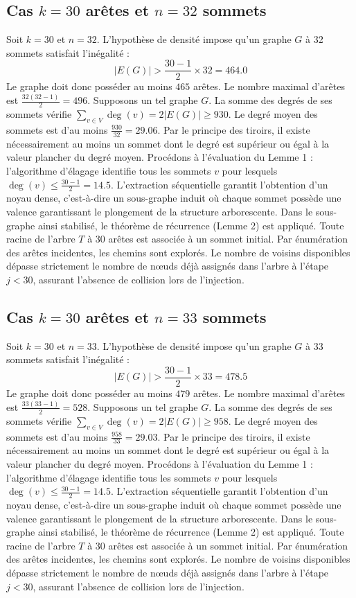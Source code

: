\documentclass[12pt,a4paper]{article}
\begin{document}
\subsection{Cas $k = 30$ arêtes et $n = 32$ sommets}
Soit $k = 30$ et $n = 32$. L'hypothèse de densité impose qu'un graphe $G$ à 32 sommets satisfait l'inégalité :
$$ |E(G)| > \frac{30-1}{2} \times 32 = 464.0 $$
Le graphe doit donc posséder au moins $465$ arêtes. Le nombre maximal d'arêtes est $\frac{32(32-1)}{2} = 496$.
Supposons un tel graphe $G$. La somme des degrés de ses sommets vérifie $\sum_{v \in V} \deg(v) = 2|E(G)| \geq 930$.
Le degré moyen des sommets est d'au moins $\frac{930}{32} = 29.06$.
Par le principe des tiroirs, il existe nécessairement au moins un sommet dont le degré est supérieur ou égal à la valeur plancher du degré moyen.
Procédons à l'évaluation du Lemme 1 : l'algorithme d'élagage identifie tous les sommets $v$ pour lesquels $\deg(v) \leq \frac{30-1}{2} = 14.5$.
L'extraction séquentielle garantit l'obtention d'un noyau dense, c'est-à-dire un sous-graphe induit où chaque sommet possède une valence garantissant le plongement de la structure arborescente.
Dans le sous-graphe ainsi stabilisé, le théorème de récurrence (Lemme 2) est appliqué. Toute racine de l'arbre $T$ à 30 arêtes est associée à un sommet initial. Par énumération des arêtes incidentes, les chemins sont explorés. Le nombre de voisins disponibles dépasse strictement le nombre de nœuds déjà assignés dans l'arbre à l'étape $j < 30$, assurant l'absence de collision lors de l'injection.

\subsection{Cas $k = 30$ arêtes et $n = 33$ sommets}
Soit $k = 30$ et $n = 33$. L'hypothèse de densité impose qu'un graphe $G$ à 33 sommets satisfait l'inégalité :
$$ |E(G)| > \frac{30-1}{2} \times 33 = 478.5 $$
Le graphe doit donc posséder au moins $479$ arêtes. Le nombre maximal d'arêtes est $\frac{33(33-1)}{2} = 528$.
Supposons un tel graphe $G$. La somme des degrés de ses sommets vérifie $\sum_{v \in V} \deg(v) = 2|E(G)| \geq 958$.
Le degré moyen des sommets est d'au moins $\frac{958}{33} = 29.03$.
Par le principe des tiroirs, il existe nécessairement au moins un sommet dont le degré est supérieur ou égal à la valeur plancher du degré moyen.
Procédons à l'évaluation du Lemme 1 : l'algorithme d'élagage identifie tous les sommets $v$ pour lesquels $\deg(v) \leq \frac{30-1}{2} = 14.5$.
L'extraction séquentielle garantit l'obtention d'un noyau dense, c'est-à-dire un sous-graphe induit où chaque sommet possède une valence garantissant le plongement de la structure arborescente.
Dans le sous-graphe ainsi stabilisé, le théorème de récurrence (Lemme 2) est appliqué. Toute racine de l'arbre $T$ à 30 arêtes est associée à un sommet initial. Par énumération des arêtes incidentes, les chemins sont explorés. Le nombre de voisins disponibles dépasse strictement le nombre de nœuds déjà assignés dans l'arbre à l'étape $j < 30$, assurant l'absence de collision lors de l'injection.
\end{document}
